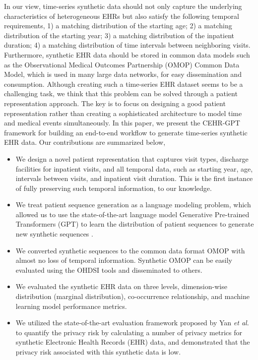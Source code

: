 \begin{multicols}{2}
In our view, time-series synthetic data should not only capture the underlying characteristics of heterogeneous EHRs but also satisfy the following temporal requirements, 1) a matching distribution of the starting age; 2) a matching distribution of the starting year; 3) a matching distribution of the inpatient duration; 4) a matching distribution of time intervals between neighboring visits. Furthermore, synthetic EHR data should be stored in common data models such as the Observational Medical Outcomes Partnership (OMOP) Common Data Model, which is used in many large data networks, \cite{Hripcsak2013} for easy dissemination and consumption. Although creating such a time-series EHR dataset seems to be a challenging task, we think that this problem can be solved through a patient representation approach. The key is to focus on designing a good patient representation rather than creating a sophisticated architecture to model time and medical events simultaneously. In this paper, we present the CEHR-GPT framework for building an end-to-end workflow to generate time-series synthetic EHR data. Our contributions are summarized below, 
\begin{itemize}
  \item We design a novel patient representation that captures visit types, discharge facilities for inpatient visits, and all temporal data, such as starting year, age, intervals between visits, and inpatient visit duration. This is the first instance of fully preserving such temporal information, to our knowledge.
  \item We treat patient sequence generation as a language modeling problem, which allowed us to use the state-of-the-art language model Generative Pre-trained Transformers (GPT) to learn the distribution of patient sequences to generate new synthetic sequences \cite{Radford, Vaswani}.  
  \item We converted synthetic sequences to the common data format OMOP with almost no loss of temporal information. Synthetic OMOP can be easily evaluated using the OHDSI tools and disseminated to others.  
  \item We evaluated the synthetic EHR data on three levels, dimension-wise distribution (marginal distribution), co-occurrence relationship, and machine learning model performance metrics. 
  \item We utilized the state-of-the-art evaluation framework proposed by Yan \textit{et al.} \cite{Yan_Brad_2022} to quantify the privacy risk by calculating a number of privacy metrics for synthetic Electronic Health Records (EHR) data, and demonstrated that the privacy risk associated with this synthetic data is low.
\end{itemize}


\end{multicols}

